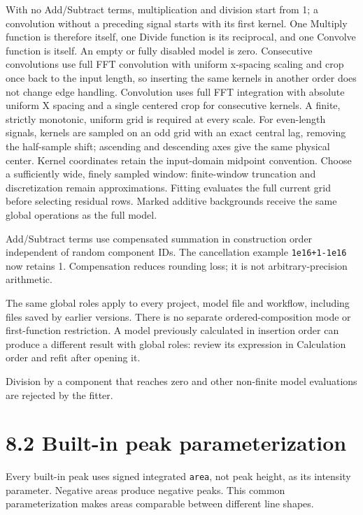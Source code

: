 \documentclass[
  10pt,
  a4paper,
  oneside]{scrreprt}
\begin{document}
With no Add/Subtract terms, multiplication and division start from 1; a
convolution without a preceding signal starts with its first kernel. One
Multiply function is therefore itself, one Divide function is its
reciprocal, and one Convolve function is itself. An empty or fully
disabled model is zero. Consecutive convolutions use full FFT
convolution with uniform x-spacing scaling and crop once back to the
input length, so inserting the same kernels in another order does not
change edge handling. Convolution uses full FFT integration with
absolute uniform X spacing and a single centered crop for consecutive
kernels. A finite, strictly monotonic, uniform grid is required at every
scale. For even-length signals, kernels are sampled on an odd grid with
an exact central lag, removing the half-sample shift; ascending and
descending axes give the same physical center. Kernel coordinates retain
the input-domain midpoint convention. Choose a sufficiently wide, finely
sampled window: finite-window truncation and discretization remain
approximations. Fitting evaluates the full current grid before selecting
residual rows. Marked additive backgrounds receive the same global
operations as the full model.

Add/Subtract terms use compensated summation in construction order
independent of random component IDs. The cancellation example
\texttt{1e16+1-1e16} now retains 1. Compensation reduces rounding loss;
it is not arbitrary-precision arithmetic.

The same global roles apply to every project, model file and workflow,
including files saved by earlier versions. There is no separate
ordered-composition mode or first-function restriction. A model
previously calculated in insertion order can produce a different result
with global roles: review its expression in Calculation order and refit
after opening it.

Division by a component that reaches zero and other non-finite model
evaluations are rejected by the fitter.

\hypertarget{built-in-peak-parameterization}{%
\section{8.2 Built-in peak
parameterization}\label{built-in-peak-parameterization}}

Every built-in peak uses signed integrated \texttt{area}, not peak
height, as its intensity parameter. Negative areas produce negative
peaks. This common parameterization makes areas comparable between
different line shapes.
\end{document}
